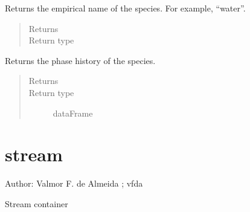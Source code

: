 \documentclass[letterpaper,10pt,openany,oneside,english]{sphinxmanual}
\begin{document}
\begin{fulllineitems}

\begin{fulllineitems}
\label{\detokenize{support_rst/specie:specie.Specie.name}}
Returns the empirical name of the species. For example, “water”.
\begin{quote}\begin{description}
\item[{Returns}] \leavevmode
{}

\item[{Return type}] \leavevmode
{}

\end{description}\end{quote}

\end{fulllineitems}


\begin{fulllineitems}
\label{\detokenize{support_rst/specie:specie.Specie.phase}}
Returns the phase history of the species.
\begin{quote}\begin{description}
\item[{Returns}] \leavevmode
{}

\item[{Return type}] \leavevmode
dataFrame

\end{description}\end{quote}

\end{fulllineitems}


\end{fulllineitems}



\section{stream}
\label{\detokenize{support_rst/stream:module-stream}}\label{\detokenize{support_rst/stream:stream}}\label{\detokenize{support_rst/stream::doc}}
Author: Valmor F. de Almeida ; vfda

Stream container
\end{document}
